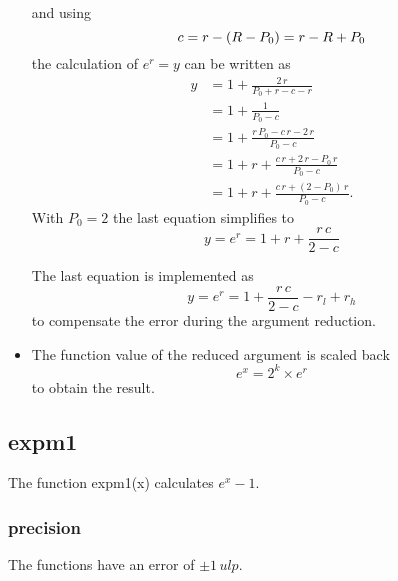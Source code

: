 \documentclass[10pt,a4paper]{article}
\numberwithin{equation}{subsection}
\begin{document}
\begin{itemize}
    and using
    \begin{equation}
        c = r - (R-P_0) = r - R + P_0 \\
    \end{equation}
    the calculation of $e^r=y$ can be written as
    \[
        \begin{aligned}
            y &= 1 + \frac{2\,r}{P_0+r-c-r} \\
              &= 1 + \frac{1}{P_0-c} \\
              &= 1 + \frac{r\,P_0 - c\,r -2\,r}{P_0-c} \\
              &= 1 + r + \frac{c\,r+2\,r-P_0\,r}{P_0-c} \\
              &= 1 + r + \frac{c\,r+(2-P_0)\,r}{P_0-c}.
         \end{aligned}
    \]
    With $P_0 = 2$ the last equation simplifies to
    \begin{equation}
        y= e^r= 1 + r + \frac{r\,c}{2-c}
    \end{equation}

    The last equation is implemented as
    \[
        y= e^r= 1 + \frac{r\,c}{2-c} - r_l + r_h
    \]
    to compensate the error during the argument reduction.


\item The function value of the reduced argument is scaled back
    \begin{equation}
        e^x = 2^k \times e^r
    \end{equation}
    to obtain the result.

\end{itemize}


\subsection{expm1}
\label{sub_sec:expm1}
The function expm1(x) calculates $ e^x-1 $.

\subsubsection{precision}
The functions have an error of $ \pm 1\, ulp$.
\end{document}
